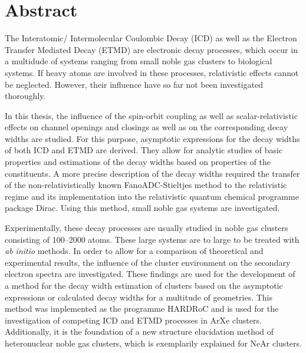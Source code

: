 \chapter*{Abstract}
\thispagestyle{empty}
The Interatomic/ Intermolecular Coulombic Decay (ICD) as well as the
Electron Transfer Mediated Decay (ETMD) are electronic decay
processes, which occur in a multidude of systems ranging from small
noble gas clusters to biological systems.
If heavy atoms are involved in these processes, relativistic effects
cannot be neglected. However, their influence have so far not
been investigated thoroughly.

In this thesis, the influence of the spin-orbit coupling as well as
scalar-relativistic effects on channel openings and closings as well
as on the corresponding decay widths are studied.
For this purpose, asymptotic expressions for the decay widths of both
ICD and ETMD are derived. They allow for analytic studies of basic
properties and estimations of the decay widths based on properties
of the constituents.
A more precise description of the decay widths required the transfer of
the non-relativistically known FanoADC-Stieltjes method to the relativistic
regime and its implementation into the relativistic quantum chemical
programme package Dirac. Using this method, small noble gas systems
are investigated. 

Experimentally, these decay processes are usually studied in noble gas
clusters consisting of 100--2000 atoms. These large systems are to
large to be treated with \emph{ab initio} methods. In order to allow
for a comparison of theoretical and experimental results, the influence
of the cluster environment on the secondary electron spectra are
investigated. These findings are used for the development of a method
for the decay width estimation of clusters based on the asymptotic
expressions or calculated decay widths for a multitude of geometries.
This method was implemented as the programme HARDRoC and
is used for the investigation of competing ICD and ETMD processes in
ArXe clusters. Additionally, it is the foundation of a new
structure elucidation method of heteronuclear noble gas clusters,
which is exemplarily explained for NeAr clusters.
